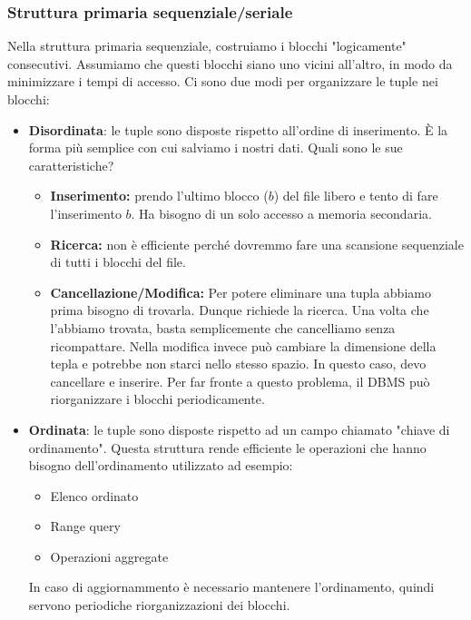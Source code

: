 \documentclass[a4paper]{article}
\begin{document}
\subsubsection{Struttura primaria sequenziale/seriale}

Nella struttura primaria sequenziale, costruiamo i blocchi
"logicamente" consecutivi. Assumiamo che questi blocchi siano uno vicini all'altro,
in modo da minimizzare i tempi di accesso.
Ci sono due modi per organizzare le tuple nei blocchi:
\begin{itemize}
    \item \textbf{Disordinata}: le tuple sono disposte rispetto all'ordine di inserimento.
    È la forma più semplice con cui salviamo i nostri dati.
    Quali sono le sue caratteristiche?
    \begin{itemize}
        \item \textbf{Inserimento:} prendo l'ultimo blocco ($b$) del file libero e tento di fare
        l'inserimento $b$. Ha bisogno di un solo accesso a memoria secondaria.
        \item \textbf{Ricerca:} non è efficiente perché dovremmo fare una scansione
        sequenziale di tutti i blocchi del file.
        \item \textbf{Cancellazione/Modifica:} Per potere eliminare una tupla
        abbiamo prima bisogno di trovarla. Dunque richiede la ricerca. Una volta
        che l'abbiamo trovata, basta semplicemente che cancelliamo senza ricompattare.
        Nella modifica invece può cambiare la dimensione della tepla e potrebbe
        non starci nello stesso spazio. In questo caso,
        devo cancellare e inserire. Per far fronte a questo problema,
        il DBMS può riorganizzare i blocchi periodicamente.
    \end{itemize}
    \item \textbf{Ordinata}: le tuple sono disposte rispetto ad un campo chiamato "chiave di ordinamento".
    Questa struttura rende efficiente le operazioni che hanno bisogno dell'ordinamento
    utilizzato ad esempio:
    \begin{itemize}
        \item Elenco ordinato
        \item Range query
        \item Operazioni aggregate
    \end{itemize}
    In caso di aggiornammento è necessario mantenere l'ordinamento,
    quindi servono periodiche riorganizzazioni dei blocchi.
    \begin{itemize}

\end{itemize}
\end{itemize}
\end{document}
